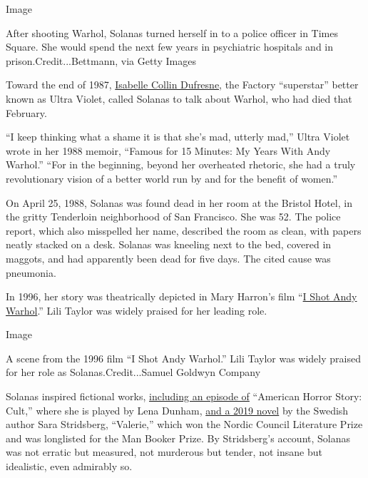 Image

After shooting Warhol, Solanas turned herself in to a police officer in
Times Square. She would spend the next few years in psychiatric
hospitals and in prison.Credit...Bettmann, via Getty Images

Toward the end of 1987,
\href{https://www.nytimes.com/2014/06/16/arts/ultra-violet-andy-warhol-superstar-dies-at-78.html}{Isabelle
Collin Dufresne}, the Factory ``superstar'' better known as Ultra
Violet, called Solanas to talk about Warhol, who had died that February.

``I keep thinking what a shame it is that she's mad, utterly mad,''
Ultra Violet wrote in her 1988 memoir, ``Famous for 15 Minutes: My Years
With Andy Warhol.'' ``For in the beginning, beyond her overheated
rhetoric, she had a truly revolutionary vision of a better world run by
and for the benefit of women.''

On April 25, 1988, Solanas was found dead in her room at the Bristol
Hotel, in the gritty Tenderloin neighborhood of San Francisco. She was
52. The police report, which also misspelled her name, described the
room as clean, with papers neatly stacked on a desk. Solanas was
kneeling next to the bed, covered in maggots, and had apparently been
dead for five days. The cited cause was pneumonia.

In 1996, her story was theatrically depicted in Mary Harron's film
``\href{https://archive.nytimes.com/www.nytimes.com/library/film/i_shot_andy_warhol.html}{I
Shot Andy Warhol}.'' Lili Taylor was widely praised for her leading
role.

Image

A scene from the 1996 film ``I Shot Andy Warhol.'' Lili Taylor was
widely praised for her role as Solanas.Credit...Samuel Goldwyn Company

Solanas inspired fictional works,
\href{https://www.hollywoodreporter.com/live-feed/american-horror-story-cult-story-beheind-lena-dunhams-episode-1050134\#:~:text=Lena\%20Dunham\%20made\%20her\%20one,Warhol\%20in\%20the\%20late\%201960s.\&text=In\%20the\%20flashback\%2C\%20Dunham\%20inhabited,who\%20had\%20diagnosed\%20paranoid\%20schizophrenia.}{including
an episode of} ``American Horror Story: Cult,'' where she is played by
Lena Dunham,
\href{https://www.nytimes.com/2019/08/21/t-magazine/summer-fall-books-illustrated.html}{and
a 2019 novel} by the Swedish author Sara Stridsberg, ``Valerie,'' which
won the Nordic Council Literature Prize and was longlisted for the Man
Booker Prize. By Stridsberg's account, Solanas was not erratic but
measured, not murderous but tender, not insane but idealistic, even
admirably so.

